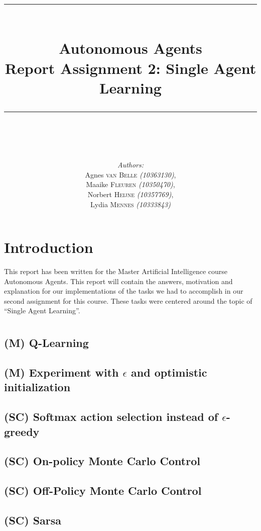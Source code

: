 \documentclass{article}
\newcommand{\HRule}{\rule{\linewidth}{0.1mm}}
\begin{document}
\title{ \HRule \\[0.2cm]
		Autonomous Agents\\ 
		Report Assignment 2: Single Agent Learning\\
		\HRule \\[0.1cm]
		}
		
\author{
		\emph{Authors:}\\[0.2cm]
		Agnes \textsc{van Belle} \small{ \emph{(10363130)}},\\ 
		Maaike \textsc{Fleuren} \small{ \emph{(10350470)}}, \\
		Norbert \textsc{Heijne} \small{ \emph{(10357769)}}, \\
		Lydia \textsc{Mennes} \small{ \emph{(10333843)}}
		}
		
\maketitle

\section{Introduction}
This report has been written for the Master Artificial Intelligence course Autonomous Agents. This report will contain the answers, motivation and explanation for our implementations of the tasks we had to accomplish in our second assignment for this course. These tasks were centered around the topic of ``Single Agent Learning''. 

\section{}
\subsection{(M) Q-Learning}
\subsection{(M) Experiment with $\epsilon$ and optimistic initialization}
\subsection{(SC) Softmax action selection instead of $\epsilon$-greedy}
\subsection{(SC) On-policy Monte Carlo Control}
\subsection{(SC) Off-Policy Monte Carlo Control}
\subsection{(SC) Sarsa}
\end{document}
